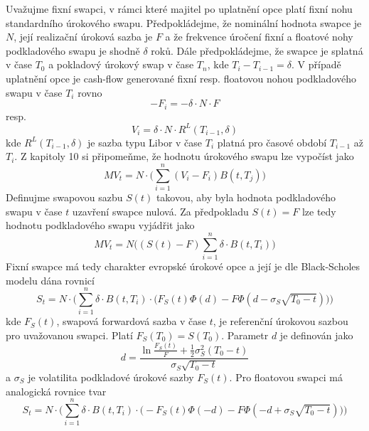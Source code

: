 \documentclass[a4paper]{book}
\begin{document}
Uvažujme fixní swapci, v rámci které majitel po uplatnění opce platí fixní nohu standardního úrokového swapu. Předpokládejme, že nominální hodnota swapce je $N$, její realizační úroková sazba je $F$ a že frekvence úročení fixní a floatové nohy podkladového swapu je shodně $\delta$ roků. Dále předpokládejme, že swapce je splatná v čase $T_0$ a pokladový úrokový swap v čase $T_n$, kde $T_i - T_{i-1} = \delta$. V případě uplatnění opce je cash-flow generované fixní resp. floatovou nohou podkladového swapu v čase $T_i$ rovno
\begin{equation*}
-F_i = -\delta \cdot N \cdot F
\end{equation*}
resp.
\begin{equation*}
V_i = \delta \cdot N \cdot R^L(T_{i-1}, \delta) 
\end{equation*}
kde $R^L(T_{i-1}, \delta)$ je sazba typu Libor v čase $T_i$ platná pro časové období $T_{i-1}$ až $T_i$. Z kapitoly 10 si připomeňme, že hodnotu úrokového swapu lze vypočíst jako
\begin{equation*}
MV_t = N \cdot \Big( \sum_{i=1}^n (V_i - F_i)B(t,T_j)\Big)
\end{equation*}
Definujme swapovou sazbu $S(t)$ takovou, aby byla hodnota podkladového swapu v čase $t$ uzavření swapce nulová. Za předpokladu $S(t) = F$ lze tedy hodnotu podkladového swapu vyjádřit jako
\begin{equation*}
MV_t = N \Bigg((S(t) - F)\sum_{i = 1}^n \delta \cdot B(t, T_i) \Bigg)
\end{equation*}
Fixní swapce má tedy charakter evropské úrokové opce a její je dle Black-Scholes modelu dána rovnicí
\begin{equation*}
S_t = N \cdot \Bigg(\sum_{i=1}^n \delta \cdot B(t, T_i) \cdot \big( F_S(t) \Phi(d) - F \Phi(d - \sigma_S \sqrt{T_0 - t})\big) \Bigg)
\end{equation*}
kde $F_S(t)$, swapová forwardová sazba v čase $t$, je referenční úrokovou sazbou pro uvažovanou swapci. Platí $F_S(T_0) = S(T_0)$. Parametr $d$ je definován jako
\begin{equation*}
d = \frac{\ln \frac{F_S(t)}{F} + \frac{1}{2}\sigma_S^2(T_0 - t)}{\sigma_S \sqrt{T_0 - t}}
\end{equation*}
a $\sigma_S$ je volatilita podkladové úrokové sazby $F_S(t)$. Pro floatovou swapci má analogická rovnice tvar
\begin{equation*}
S_t = N \cdot \Bigg(\sum_{i=1}^n \delta \cdot B(t, T_i) \cdot \big( -F_S(t) \Phi(-d) - F \Phi(-d + \sigma_S \sqrt{T_0 - t})\big) \Bigg)
\end{equation*}
\end{document}
